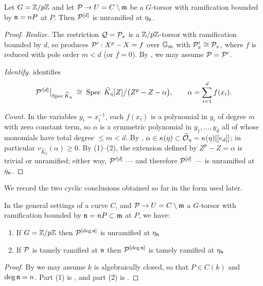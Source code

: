 \begin{theorem}[the wild case, $G = \Z/p\Z$]\label{theorem:wild_Zp_after_blowup}
    Let $G = \Z/p\Z$ and let $\mathcal{P} \to U = C \setminus \mathfrak{m}$ be a $G$-torsor with
    ramification bounded by $\mathfrak{n} = nP$ at $P$. Then $\mathcal{P}^{[d]}$ is unramified
    at $\eta_{\mathfrak{n}}$.
\end{theorem}
\begin{proof}
    \emph{Realize.} The restriction $\mathcal{Q} = \mathcal{P}_x$ is a $\mathbb{Z}/p\mathbb{Z}$-torsor with
    ramification bounded by $d$, so  produces
    $\mathcal{P}' : X^p - X = f$ over $\mathbb{G}_m$ with $\mathcal{P}'_x \cong \mathcal{P}_x$, where $f$ is
    reduced with pole order $m < d$ (or $f = 0$). By ,
    we may assume $\mathcal{P} = \mathcal{P}'$.

    \emph{Identify.}  identifies
    \[
        \mathcal{P}'^{[d]}\big|_{\operatorname{Spec} \widehat K_\eta}
        \;\cong\;
        \operatorname{Spec}\; \widehat K_\eta[Z]\big/\bigl(Z^p - Z - \alpha\bigr),
        \qquad
        \alpha = \sum_{i=1}^{d} f(x_i).
    \]

    \emph{Count.} In the variables $y_i = x_i^{-1}$, each $f(x_i)$ is a
    polynomial in $y_i$ of degree $m$ with zero constant term, so $\alpha$ is a
    symmetric polynomial in $y_1, \dots, y_d$ all of whose monomials have total
    degree $\leq m < d$. By ,
    $\alpha \in \kappa(\eta) \subset \widehat{\mathcal{O}}_\eta = \kappa(\eta)[[e_d]]$; in
    particular $v_{\widehat K_\eta}(\alpha) \geq 0$. By
    (1)--(2), the extension defined by
    $Z^p - Z = \alpha$ is trivial or unramified; either way, $\mathcal{P}'^{[d]}$ ---
    and therefore $\mathcal{P}^{[d]}$ --- is unramified at $\eta_{\mathfrak{n}}$.
\end{proof}

We record the two cyclic conclusions obtained so far in the form used later.

\begin{cor}\label{cor:ramification_after_blowup_is_tame}
    In the general settings of a curve $C$, and $\mathcal{P} \to U=C \setminus \mathfrak{m}$ a $G$-torsor with ramification bounded by $\mathfrak{n} = n P \subset \mathfrak{m}$ at $P$, we have:
    \begin{enumerate}
        \item If $G=\Z/p\Z$ then $\mathcal{P}^{[\deg \mathfrak{n}]}$ is unramified at $\eta_{\mathfrak{n}}$
        \item If $\mathcal{P}$ is tamely ramified at $\mathfrak{n}$ then $\mathcal{P}^{[\deg \mathfrak{n}]}$ is tamely ramified at $\eta_{\mathfrak{n}}$
    \end{enumerate}
\end{cor}
\begin{proof}
    By  we may assume $k$ is
    algebraically closed, so that $P \in C(k)$ and $\deg \mathfrak{n} = n$. Part (1) is
    , and part (2) is
    .
\end{proof}

